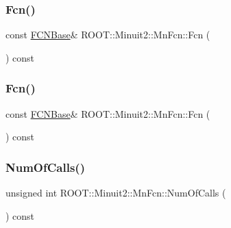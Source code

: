\subsubsection{\texorpdfstring{Fcn()}{Fcn()}\hspace{0.1cm}{\footnotesize\ttfamily [2/3]}}
{\footnotesize\ttfamily const \mbox{\hyperlink{classROOT_1_1Minuit2_1_1FCNBase}{F\+C\+N\+Base}}\& R\+O\+O\+T\+::\+Minuit2\+::\+Mn\+Fcn\+::\+Fcn (\begin{DoxyParamCaption}{ }\end{DoxyParamCaption}) const\hspace{0.3cm}{\ttfamily [inline]}}

\mbox{\label{classROOT_1_1Minuit2_1_1MnFcn_a667fd993a6bb4832e6e70b7eaaca9fa4}} 
\subsubsection{\texorpdfstring{Fcn()}{Fcn()}\hspace{0.1cm}{\footnotesize\ttfamily [3/3]}}
{\footnotesize\ttfamily const \mbox{\hyperlink{classROOT_1_1Minuit2_1_1FCNBase}{F\+C\+N\+Base}}\& R\+O\+O\+T\+::\+Minuit2\+::\+Mn\+Fcn\+::\+Fcn (\begin{DoxyParamCaption}{ }\end{DoxyParamCaption}) const\hspace{0.3cm}{\ttfamily [inline]}}

\mbox{\label{classROOT_1_1Minuit2_1_1MnFcn_af8dc896f10dc8a53429260198cd0e1c5}} 
\subsubsection{\texorpdfstring{NumOfCalls()}{NumOfCalls()}\hspace{0.1cm}{\footnotesize\ttfamily [1/3]}}
{\footnotesize\ttfamily unsigned int R\+O\+O\+T\+::\+Minuit2\+::\+Mn\+Fcn\+::\+Num\+Of\+Calls (\begin{DoxyParamCaption}{ }\end{DoxyParamCaption}) const\hspace{0.3cm}{\ttfamily [inline]}}

